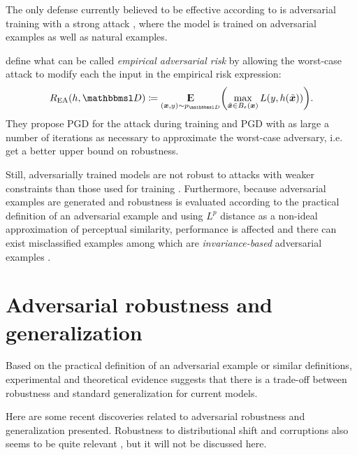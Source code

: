 \documentclass[oneside]{book}
\begin{document}
The only defense currently believed to be effective according to \citet{Athalye:2018:OGGFSS} is adversarial training \citep{Goodfellow:2014:EHAE} with a strong attack \citep{Madry:2017:TDLMRAA}, where the model is trained on adversarial examples as well as natural examples.

\citet{Madry:2017:TDLMRAA} define what can be called \textit{empirical adversarial risk} by allowing the worst-case attack to modify each the input in the empirical risk expression:
\begin{align}
R_\text{EA}(h,\set D) \coloneqq \E_{(\vec x, y)\sim p_{\set D}} \del{\max_{\tilde{\vec x}\in B_\epsilon(\vec x)} L(y,h(\tilde{\vec x}))} \text{.}
\end{align}
They propose PGD for the attack during training and PGD with as large a number of iterations as necessary to approximate the worst-case adversary, i.e. get a better upper bound on robustness.

Still, adversarially trained models are not robust to attacks with weaker constraints than those used for training \citep{Schott:2018:TDFARNNMM}. Furthermore, because adversarial examples are generated and robustness is evaluated according to the practical definition of an adversarial example and using $L^p$ distance as a non-ideal approximation of perceptual similarity, performance is affected \citep{Madry:2017:TDLMRAA,Tsipras:2018:RMBOA} and there can exist misclassified examples among which are \textit{invariance-based} adversarial examples \citep{Jacobsen:2019:EEICNBAR}.



\section{Adversarial robustness and generalization} \label{sec:robustness-generalization}

Based on the practical definition of an adversarial example or similar definitions, experimental \citep{Madry:2017:TDLMRAA,Su:2018:IRTCOACSRDICM} and theoretical evidence \citep{Tsipras:2018:RMBOA} suggests that there is a trade-off between robustness and standard generalization for current models.

Here are some recent discoveries related to adversarial robustness and generalization presented. Robustness to distributional shift and corruptions also seems to be quite relevant \citep{Gilmer:2019:AENCTEN,Hendrycks:2019:BNNRCCP}, but it will not be discussed here.
\end{document}
